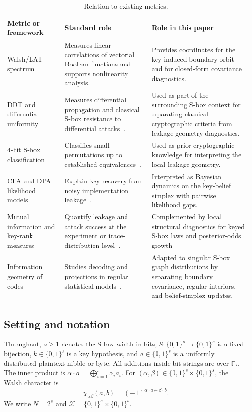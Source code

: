 \documentclass[referee,lineno,pdflatex,sn-mathphys-num]{sn-jnl}
\theoremstyle{thmstylethree}
\theoremstyle{thmstyletwo}
\theoremstyle{thmstyleone}
\newcommand{\F}{\mathbb{F}}
\newcommand{\B}[1]{\{0,1\}^{#1}}
\begin{document}
\begin{table}[t]
\centering
\caption{Relation to existing metrics.}
\label{tab:sota-positioning}
\footnotesize
\setlength{\tabcolsep}{3pt}
\begin{tabular}{@{}p{}p{}p{}@{}}
\toprule
Metric or framework & Standard role & Role in this paper \\
\midrule
Walsh/LAT spectrum & Measures linear correlations of vectorial Boolean
functions and supports nonlinearity analysis. & Provides coordinates for the
key-induced boundary orbit and for closed-form covariance diagnostics. \\
DDT and differential uniformity & Measures differential propagation and
classical S-box resistance to differential attacks~\cite{nyberg1994differentially}. &
Used as part of the surrounding S-box context for separating classical
cryptographic criteria from leakage-geometry diagnostics. \\
4-bit S-box classification & Classifies small permutations up to established
equivalences~\cite{leander2007classification}. & Used as prior cryptographic
knowledge for interpreting the local leakage geometry. \\
CPA and DPA likelihood models & Explain key recovery from noisy implementation
leakage~\cite{kocher1999differential,brier2004correlation}. & Interpreted as
Bayesian dynamics on the key-belief simplex with pairwise likelihood gaps. \\
Mutual information and key-rank measures & Quantify leakage and attack success
at the experiment or trace-distribution level~\cite{standaert2009unified,veyrat2009adaptive}. &
Complemented by local structural diagnostics for keyed S-box laws and
posterior-odds growth. \\
Information geometry of codes & Studies decoding and projections in regular
statistical models~\cite{ikeda2004information}. & Adapted to singular S-box
graph distributions by separating boundary covariance, regular interiors, and
belief-simplex updates. \\
\bottomrule
\end{tabular}
\end{table}

\subsection{Setting and notation}

Throughout, $s\geq1$ denotes the S-box width in bits,
$S:\B{s}\to\B{s}$ is a fixed bijection, $k\in\B{s}$ is a key hypothesis, and
$a\in\B{s}$ is a uniformly distributed plaintext nibble or byte.  All additions
inside bit strings are over $\F_2$.  The inner product is
$\alpha\cdot a=\bigoplus_{i=1}^s \alpha_i a_i$.  For
$(\alpha,\beta)\in\B{s}\times\B{s}$, the Walsh character is
\[
  \chi_{\alpha\beta}(a,b)=(-1)^{\alpha\cdot a\oplus\beta\cdot b}.
\]
We write $N=2^s$ and $\mathcal X=\B{s}\times\B{s}$.
\end{document}
